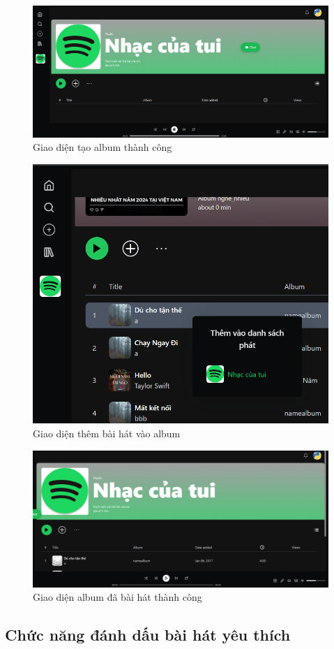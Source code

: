 \begin{figure}[H]
    \centering
    \includegraphics[width=1\textwidth]{imgs/chap5/tao_album_3.png}
    \caption{Giao diện tạo album thành công}
\end{figure}

\begin{figure}[H]
    \centering
    \includegraphics[width=1\textwidth]{imgs/chap5/tao_album_4.png}
    \caption{Giao diện thêm bài hát vào album}
\end{figure}

\begin{figure}[H]
    \centering
    \includegraphics[width=1\textwidth]{imgs/chap5/tao_album_5.png}
    \caption{Giao diện album đã bài hát thành công}
\end{figure}

\subsection{Chức năng đánh dấu bài hát yêu thích}
